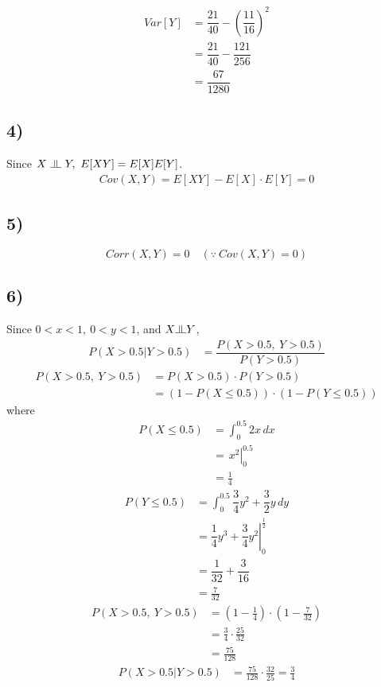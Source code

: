 \documentclass[11pt]{article}
\newcommand{\ind}{\raisebox{0.05em}{\rotatebox[origin=c]{90}{$\models$}}}
\begin{document}
    \begin{align*}
        Var\left[Y\right] &= \dfrac{21}{40}-\left( \dfrac{11}{16}\right) ^{2} \\ 
        &= \dfrac{21}{40}-\dfrac{121}{256} \\ 
        &= \dfrac{67}{1280}
    \end{align*}

    \subsection*{4)}
    Since $X\ \ind\ Y,\ E[XY] = E[X]E[Y]$.
    \begin{align*}
        Cov(X, Y) = E[XY] - E[X] \cdot E[Y] = 0
    \end{align*}

    \subsection*{5)}
    $$Corr(X, Y) = 0 \quad (\because\ Cov(X, Y) = 0)$$

    \subsection*{6)}
    Since $0 < x < 1,\ 0 < y < 1$, and $X \ind Y$,
    \begin{align*}
        P(X > 0.5 | Y > 0.5) &= \dfrac{P\left(X > 0.5,\ Y > 0.5 \right)}{P\left(Y > 0.5 \right)} 
    \end{align*}
    \begin{align*}
        P(X > 0.5,\ Y > 0.5) &= P(X > 0.5) \cdot P(Y > 0.5) \\ 
        &= (1 - P(X \leq 0.5)) \cdot (1 - P(Y \leq 0.5)) 
    \end{align*}
    where
    \begin{align*}
        P(X \leq 0.5) &= \int_{0}^{0.5}2x \,dx \\ 
        &= \left.\frac{}{}x^2\right|^{0.5}_0 \\ 
        &= \frac{1}{4}
    \end{align*}
    \begin{align*}
        P\left( Y \leq 0.5 \right)
        &= \int _{0}^{0.5}\dfrac{3}{4}y^{2}+\dfrac{3}{2}y\,dy \\ 
        &= \left. \dfrac{1}{4}y^{3}+\dfrac{3}{4}y^{2} \right|_{0}^{\frac{1}{2}}  \\ 
        &= \dfrac{1}{32}+\dfrac{3}{16} \\ 
        &= \frac{7}{32}    
    \end{align*}
    \begin{align*}
        P(X > 0.5,\ Y > 0.5) &= \left(1-\frac{1}{4}\right)\cdot \left(1 - \frac{7}{32}\right) \\ 
        &= \frac{3}{4} \cdot \frac{25}{32} \\ 
        &= \frac{75}{128}
    \end{align*}
    \begin{align*}
        P(X > 0.5 | Y > 0.5) &= {\frac{75}{128}}\cdot{\frac{32}{25}} = \frac{3}{4} \\  
    \end{align*}
\end{document}
